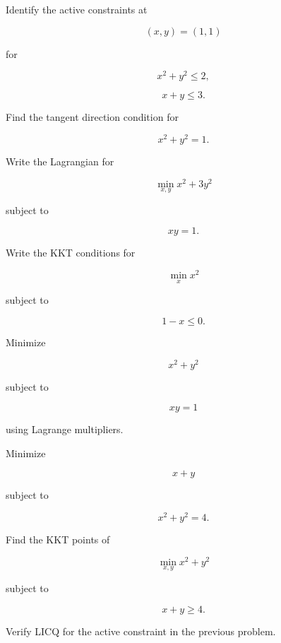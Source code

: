 \begin{exercise}[2]
Identify the active constraints at

\[
(x,y)=(1,1)
\]

for

\[
x^2+y^2\leq2,
\]

\[
x+y\leq3.
\]
\end{exercise}

\begin{exercise}[2]
Find the tangent direction condition for

\[
x^2+y^2=1.
\]
\end{exercise}

\begin{exercise}[2]
Write the Lagrangian for

\[
\min_{x,y}
x^2+3y^2
\]

subject to

\[
xy=1.
\]
\end{exercise}

\begin{exercise}[2]
Write the KKT conditions for

\[
\min_x
x^2
\]

subject to

\[
1-x\leq0.
\]
\end{exercise}

\begin{exercise}[3]
Minimize

\[
x^2+y^2
\]

subject to

\[
xy=1
\]

using Lagrange multipliers.
\end{exercise}

\begin{exercise}[3]
Minimize

\[
x+y
\]

subject to

\[
x^2+y^2=4.
\]
\end{exercise}

\begin{exercise}[3]
Find the KKT points of

\[
\min_{x,y}
x^2+y^2
\]

subject to

\[
x+y\geq4.
\]
\end{exercise}

\begin{exercise}[3]
Verify LICQ for the active constraint in the previous problem.
\end{exercise}

